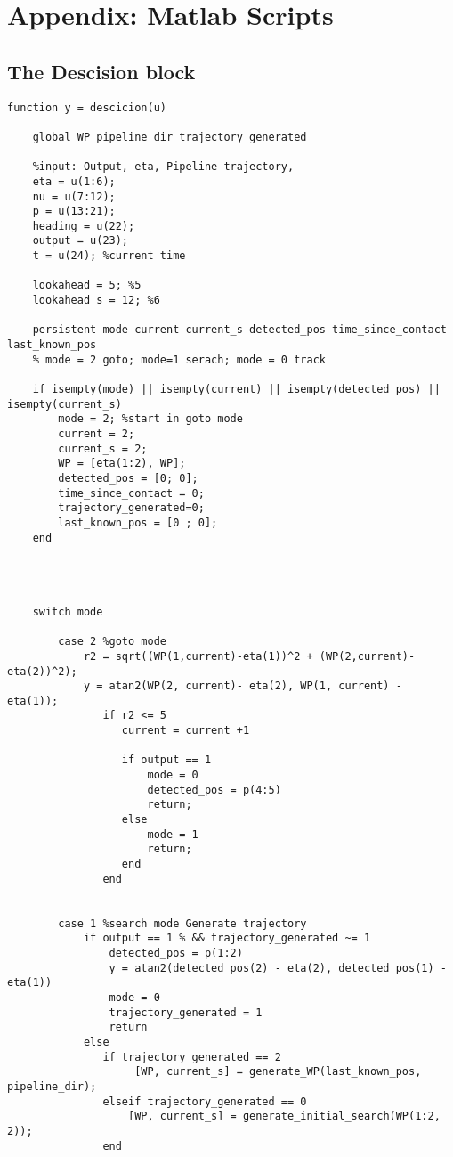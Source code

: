 \chapter{Appendix: Matlab Scripts}
\section{The Descision block}
\lstset{language=Matlab, basicstyle=\tiny}
 
\begin{lstlisting} 
function y = descicion(u)
    
    global WP pipeline_dir trajectory_generated
    
    %input: Output, eta, Pipeline trajectory,
    eta = u(1:6);
    nu = u(7:12);
    p = u(13:21);
    heading = u(22);
    output = u(23);
    t = u(24); %current time
    
    lookahead = 5; %5
    lookahead_s = 12; %6
    
    persistent mode current current_s detected_pos time_since_contact last_known_pos
    % mode = 2 goto; mode=1 serach; mode = 0 track
    
    if isempty(mode) || isempty(current) || isempty(detected_pos) || isempty(current_s)
        mode = 2; %start in goto mode
        current = 2;
        current_s = 2;
        WP = [eta(1:2), WP];
        detected_pos = [0; 0];
        time_since_contact = 0;
        trajectory_generated=0;
        last_known_pos = [0 ; 0];
    end
    
    
    
    
    switch mode
        
        case 2 %goto mode
            r2 = sqrt((WP(1,current)-eta(1))^2 + (WP(2,current)-eta(2))^2);
            y = atan2(WP(2, current)- eta(2), WP(1, current) - eta(1));
               if r2 <= 5
                  current = current +1
                  
                  if output == 1
                      mode = 0
                      detected_pos = p(4:5)
                      return;
                  else
                      mode = 1
                      return;
                  end
               end

            
        case 1 %search mode Generate trajectory
            if output == 1 % && trajectory_generated ~= 1
                detected_pos = p(1:2)
                y = atan2(detected_pos(2) - eta(2), detected_pos(1) - eta(1))
                mode = 0
                trajectory_generated = 1
                return
            else
               if trajectory_generated == 2
                    [WP, current_s] = generate_WP(last_known_pos, pipeline_dir);
               elseif trajectory_generated == 0
                   [WP, current_s] = generate_initial_search(WP(1:2, 2));
               end
               


\end{lstlisting}
